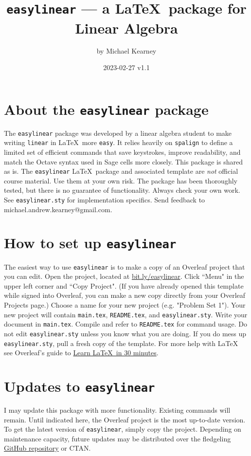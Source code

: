 \documentclass{article}
\title{\texttt{easylinear} --- a \LaTeX\ package for Linear Algebra}
\author{by Michael Kearney}
\date{2023-02-27 v1.1}
\begin{document}
\maketitle

\section{About the \texttt{easylinear} package}
The \texttt{easylinear} package was developed by a linear algebra student to make writing \texttt{linear} in \LaTeX\ more \texttt{easy}. It relies heavily on \texttt{spalign} to define a limited set of efficient commands that save keystrokes, improve readability, and match the Octave syntax used in Sage cells more closely. This package is shared as is. The \texttt{easylinear} \LaTeX\ package and associated template are \emph{not} official course material. Use them at your own risk. The package has been thoroughly tested, but there is no guarantee of functionality. Always check your own work. See \texttt{easylinear.sty} for implementation specifics. Send feedback to michael.andrew.kearney@gmail.com.

\section{How to set up \texttt{easylinear}}
The easiest way to use \texttt{easylinear} is to make a copy of an Overleaf project that you can edit. Open the project, located at \href{http://bit.ly/easylinear}{bit.ly/easylinear}. Click ``Menu" in the upper left corner and ``Copy Project". (If you have already opened this template while signed into Overleaf, you can make a new copy directly from your Overleaf Projects page.) Choose a name for your new project (e.g. "Problem Set 1"). Your new project will contain \texttt{main.tex}, \texttt{README.tex}, and \texttt{easylinear.sty}. Write your document in \texttt{main.tex}. Compile and refer to \texttt{README.tex} for command usage. Do not edit \texttt{easylinear.sty} unless you know what you are doing. If you do mess up \texttt{easylinear.sty}, pull a fresh copy of the template. For more help with \LaTeX\, see Overleaf's guide to \href{https://www.overleaf.com/learn/latex/Learn_LaTeX_in_30_minutes}{Learn \LaTeX\ in 30 minutes}.

\section{Updates to \texttt{easylinear}}
I may update this package with more functionality. Existing commands will remain. Until indicated here, the Overleaf project is the most up-to-date version. To get the latest version of \texttt{easylinear}, simply copy the project. Depending on maintenance capacity, future updates may be distributed over the fledgeling \href{https://github.com/michaelkearney55/easylinear}{GitHub repository} or CTAN.
\end{document}
